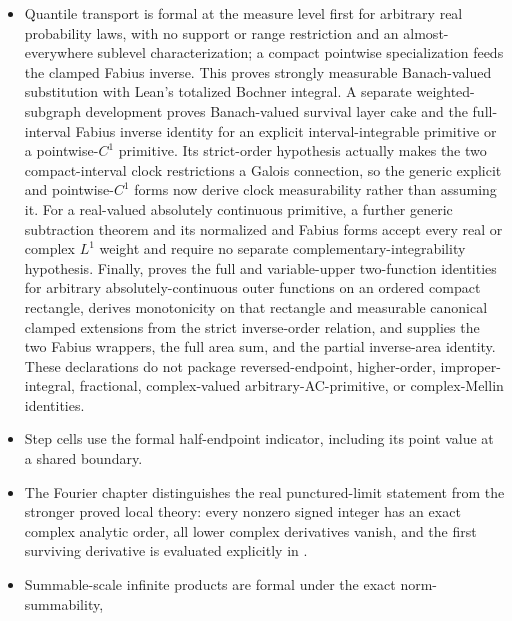 \documentclass[11pt,oneside]{article}
\theoremstyle{definition}
\theoremstyle{remark}
\begin{document}
\begin{itemize}
      of ; these are distinct from the closed
      characteristic-function product bridge and do not supply the still-open rapid-decay
      or Fourier-inversion layers.
\item Quantile transport is formal at the measure level first for arbitrary real
      probability laws, with no support or range restriction and an almost-everywhere
      sublevel characterization; a compact pointwise specialization feeds the clamped
      Fabius inverse.  This proves strongly measurable
      Banach-valued substitution with Lean's totalized Bochner integral.  A separate
      weighted-subgraph development proves Banach-valued survival layer cake and the
      full-interval Fabius inverse identity for an explicit interval-integrable primitive
      or a pointwise-\(C^1\) primitive.  Its strict-order hypothesis actually makes the
      two compact-interval clock restrictions a Galois connection, so the generic
      explicit and pointwise-\(C^1\) forms now derive clock measurability rather than
      assuming it.  For a real-valued absolutely continuous primitive, a further generic
      subtraction theorem and its normalized and Fabius forms accept every real or complex
      \(L^1\) weight and require no separate complementary-integrability hypothesis.  Finally,
       proves the full and variable-upper two-function
      identities for arbitrary absolutely-continuous outer functions on an ordered compact
      rectangle, derives monotonicity on that rectangle and measurable canonical clamped
      extensions from the strict inverse-order relation, and supplies the two Fabius wrappers,
      the full area sum, and the partial inverse-area identity.  These declarations do not
      package reversed-endpoint, higher-order, improper-integral, fractional,
      complex-valued arbitrary-AC-primitive, or complex-Mellin identities.
\item Step cells use the formal half-endpoint indicator, including its point value at a
      shared boundary.
\item The Fourier chapter distinguishes the real punctured-limit statement from the stronger
      proved local theory: every nonzero signed integer has an exact complex analytic order,
      all lower complex derivatives vanish, and the first surviving derivative is evaluated
      explicitly in .
\item Summable-scale infinite products are formal under the exact norm-summability,

\end{itemize}
\end{document}
